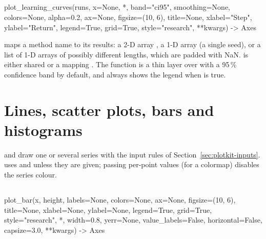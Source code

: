 \subsection{\texorpdfstring{}{plot\_learning\_curves}}

\begin{pycode}
plot_learning_curves(runs, x=None, *, band="ci95", smoothing=None, colors=None,
                     alpha=0.2, ax=None, figsize=(10, 6), title=None,
                     xlabel="Step", ylabel="Return", legend=True, grid=True,
                     style="research", **kwargs) -> Axes
\end{pycode}

 maps a method name to its results: a 2-D array
, a 1-D array (a single seed), or a list of 1-D
arrays of possibly different lengths, which are padded with NaN.  is
either shared or a mapping . The function is a thin layer
over  with a 95\,\% confidence band by default, and
always shows the legend when  is true.

\section{Lines, scatter plots, bars and histograms}\label{sec:plotkit-basic}

 and  draw one or
several series with the input rules of Section~\ref{sec:plotkit-inputs}.
 uses  and  unless they are
given; passing per-point values  (for a colormap)
disables the series colour.

\subsection{\texorpdfstring{}{plot\_bar}}

\begin{pycode}
plot_bar(x, height, labels=None, colors=None, ax=None, figsize=(10, 6),
         title=None, xlabel=None, ylabel=None, legend=True, grid=True,
         style="research", *, width=0.8, yerr=None, value_labels=False,
         horizontal=False, capsize=3.0, **kwargs) -> Axes
\end{pycode}

